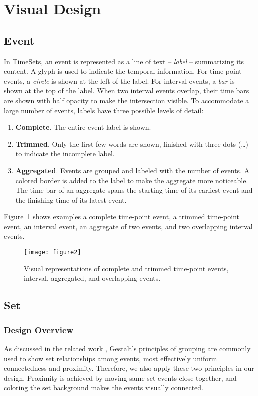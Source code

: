 \section{Visual Design}

\subsection{Event}
In TimeSets, an event is represented as a line of text -- \emph{label} -- summarizing its content. A glyph is used to indicate the temporal information. For time-point events, a \emph{circle} is shown at the left of the label. For interval events, a \emph{bar} is shown at the top of the label. When two interval events overlap, their time bars are shown with half opacity to make the intersection visible. To accommodate a large number of events, labels have three possible levels of detail: 
\begin{enumerate}
	\item \textbf{Complete}. The entire event label is shown.
	\item \textbf{Trimmed}. Only the first few words are shown, finished with three dots (\dots) to indicate the incomplete label.
	\item \textbf{Aggregated}. Events are grouped and labeled with the number of events. A colored border is added to the label to make the aggregate more noticeable. The time bar of an aggregate spans the starting time of its earliest event and the finishing time of its latest event.
\end{enumerate}	

Figure~\ref{fig:event-representation} shows examples a complete time-point event, a trimmed time-point event, an interval event, an aggregate of two events, and two overlapping interval events.

\begin{figure}[ht]
\centering
\texttt{[image: figure2]}
\caption{Visual representations of complete and trimmed time-point events, interval, aggregated, and overlapping events.}
\label{fig:event-representation}
\end{figure}

\subsection{Set}
\subsubsection{Design Overview}
As discussed in the related work , Gestalt's principles of grouping are commonly used to show set relationships among events, most effectively uniform connectedness and proximity. Therefore, we also apply these two principles in our design. Proximity is achieved by moving same-set events close together, and coloring the set background makes the events visually connected.

